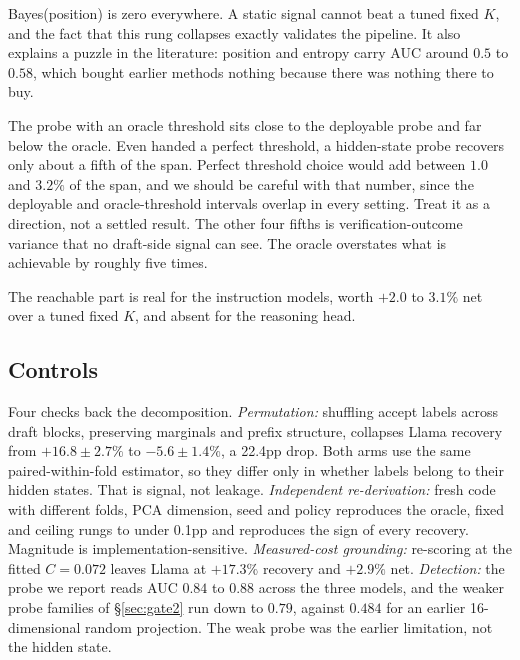 \documentclass[conference]{IEEEtran}
\begin{document}
Bayes(position) is zero everywhere. A static signal cannot beat a tuned fixed $K$, and the
fact that this rung collapses exactly validates the pipeline. It also explains a puzzle in the
literature: position and entropy carry AUC around $0.5$ to $0.58$, which bought earlier methods
nothing because there was nothing there to buy.

The probe with an oracle threshold sits close to the deployable probe and far below the
oracle. Even handed a perfect threshold, a hidden-state probe recovers only about a fifth of
the span. Perfect threshold choice would add between $1.0$ and $3.2\%$ of the span, and we
should be careful with that number, since the deployable and oracle-threshold intervals
overlap in every setting. Treat it as a direction, not a settled result. The other four
fifths is verification-outcome variance that no draft-side signal can see. The oracle
overstates what is achievable by roughly five times.

The reachable part is real for the instruction models, worth $+2.0$ to $3.1\%$ net over a
tuned fixed $K$, and absent for the reasoning head.

\subsection{Controls}
Four checks back the decomposition. \emph{Permutation:} shuffling accept labels across draft
blocks, preserving marginals and prefix structure, collapses Llama recovery from
$+16.8\pm2.7\%$ to $-5.6\pm1.4\%$, a 22.4pp drop. Both arms use the same paired-within-fold
estimator, so they differ only in whether labels belong to their hidden states. That is
signal, not leakage. \emph{Independent re-derivation:} fresh code with different folds, PCA
dimension, seed and policy reproduces the oracle, fixed and ceiling rungs to under 0.1pp and
reproduces the sign of every recovery. Magnitude is implementation-sensitive.
\emph{Measured-cost grounding:} re-scoring at the fitted $C{=}0.072$ leaves Llama at $+17.3\%$
recovery and $+2.9\%$ net. \emph{Detection:} the probe we report reads AUC $0.84$ to $0.88$
across the three models, and the weaker probe families of \S\ref{sec:gate2} run down to
$0.79$, against $0.484$ for an earlier 16-dimensional random projection. The weak probe was the earlier limitation,
not the hidden state.
\end{document}
